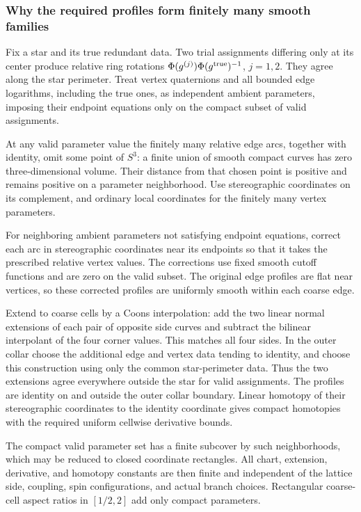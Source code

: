 \subsubsection{Why the required profiles form finitely many smooth families}\label{pre:part-10-1}

Fix a star and its true redundant data. Two trial assignments differing only at its center produce relative ring rotations
\(\Phi(g^{(j)})\Phi(g^{\rm true})^{-1}\), \(j=1,2\). They agree along the star perimeter. Treat vertex quaternions and all bounded edge logarithms, including the true ones, as independent ambient parameters, imposing their endpoint equations only on the compact subset of valid assignments.

At any valid parameter value the finitely many relative edge arcs, together with identity, omit some point of \(S^3\): a finite union of smooth compact curves has zero three-dimensional volume. Their distance from that chosen point is positive and remains positive on a parameter neighborhood. Use stereographic coordinates on its complement, and ordinary local coordinates for the finitely many vertex parameters.

For neighboring ambient parameters not satisfying endpoint equations, correct each arc in stereographic coordinates near its endpoints so that it takes the prescribed relative vertex values. The corrections use fixed smooth cutoff functions and are zero on the valid subset. The original edge profiles are flat near vertices, so these corrected profiles are uniformly smooth within each coarse edge.

Extend to coarse cells by a Coons interpolation: add the two linear normal extensions of each pair of opposite side curves and subtract the bilinear interpolant of the four corner values. This matches all four sides. In the outer collar choose the additional edge and vertex data tending to identity, and choose this construction using only the common star-perimeter data. Thus the two extensions agree everywhere outside the star for valid assignments. The profiles are identity on and outside the outer collar boundary. Linear homotopy of their stereographic coordinates to the identity coordinate gives compact homotopies with the required uniform cellwise derivative bounds.

The compact valid parameter set has a finite subcover by such neighborhoods, which may be reduced to closed coordinate rectangles. All chart, extension, derivative, and homotopy constants are then finite and independent of the lattice side, coupling, spin configurations, and actual branch choices. Rectangular coarse-cell aspect ratios in \([1/2,2]\) add only compact parameters.

